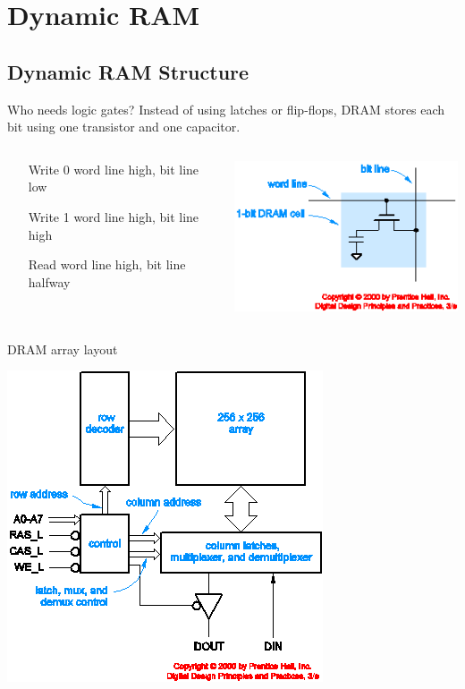 \section{Dynamic RAM}

\subsection{Dynamic RAM Structure}

\begin{frame}{Who needs logic gates?}
  Instead of using latches or flip-flops, DRAM stores each bit using one transistor and one capacitor.\\
  \begin{columns}
    \begin{column}{5cm}
      \begin{itemize}
        \item [Write 0] word line high, bit line low
        \item [Write 1] word line high, bit line high
        \item [Read] word line high, bit line halfway
      \end{itemize}
    \end{column}
    \begin{column}{5cm}
      \includegraphics[scale=0.4]{DRAMLogic}
    \end{column}
  \end{columns}
\end{frame}

\begin{frame}{DRAM array layout}
  \begin{center}
    \includegraphics[scale=0.6]{DRAMStructure}
  \end{center}
\end{frame}


